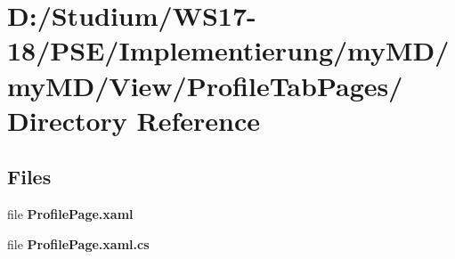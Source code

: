 \hypertarget{dir_D_3A_2FStudium_2FWS17_2D18_2FPSE_2FImplementierung_2FmyMD_2FmyMD_2FView_2FProfileTabPages_2F}{
\section{D:/Studium/WS17-18/PSE/Implementierung/my\-MD/my\-MD/View/Profile\-Tab\-Pages/ Directory Reference}
\label{dir_D_3A_2FStudium_2FWS17_2D18_2FPSE_2FImplementierung_2FmyMD_2FmyMD_2FView_2FProfileTabPages_2F}
}


\subsection*{Files}
\begin{CompactItemize}
\item 
file {\bf Profile\-Page.xaml}
\item 
file {\bf Profile\-Page.xaml.cs}
\end{CompactItemize}
